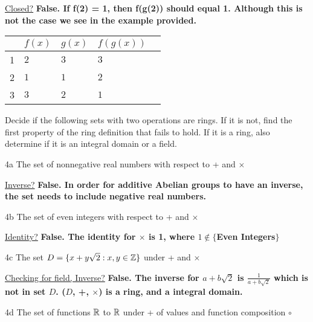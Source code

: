 \underline{Closed?} \textbf{False. If f(2) = 1, then f(g(2)) should equal 1. Although this is not the case we see in the example provided. }

\begin{tabular}{l|llll}
    & $f(x)$ & $g(x)$ & $f(g(x))$ \\
    \hline
 1  & $2$    & $3$    & $3$ \\
 2  & $1$    & $1$    & $2$ \\
 3  & $3$    & $2$    & $1$ \\
\end{tabular}


\begin{question}{4}
Decide if the following sets with two operations are rings. If it is not, find the first property of the ring definition that fails to hold. If it is a ring, also determine if it is an integral domain or a field.
\end{question}


\begin{question}{4a}
The set of nonnegative real numbers with respect to + and $\times$
\end{question}

\underline{Inverse?} \textbf{False. In order for additive Abelian groups to have an inverse, the set needs to include negative real numbers. }

\begin{question}{4b}
The set of even integers with respect to + and $\times$
\end{question}

\underline{Identity?} \textbf{False. The identity for $\times$ is 1, where $1 \notin \{$Even Integers$\}$}

\begin{question}{4c}
The set $D = \{x+y\sqrt{2} : x, y \in \mathbb{Z}\}$ under + and $\times$
\end{question}

\underline{Checking for field, Inverse?} \textbf{False. The inverse for $a+b\sqrt{2}$ is $\frac{1}{a+b\sqrt{2}}$ which is not in set $D$. ($D$, +, $\times$) is a ring, and a integral domain.}

\begin{question}{4d}
The set of functions $\mathbb{R}$ to $\mathbb{R}$ under + of values and function composition $\circ$
\end{question}

